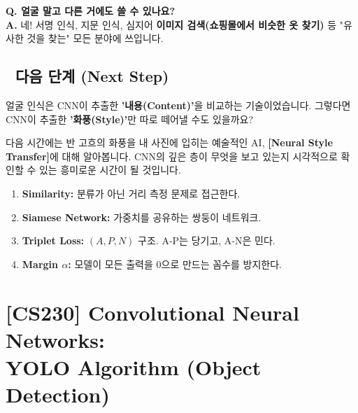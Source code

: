 \documentclass[11pt,a4paper]{book}
\theoremstyle{definition}
\begin{document}
\textbf{Q. 얼굴 말고 다른 거에도 쓸 수 있나요?} \\
\textbf{A.} 네! 서명 인식, 지문 인식, 심지어 \textbf{이미지 검색(쇼핑몰에서 비슷한 옷 찾기)} 등 "유사한 것을 찾는" 모든 분야에 쓰입니다.

\section*{🔗 다음 단계 (Next Step)}
얼굴 인식은 CNN이 추출한 \textbf{'내용(Content)'}을 비교하는 기술이었습니다.
그렇다면 CNN이 추출한 \textbf{'화풍(Style)'}만 따로 떼어낼 수도 있을까요?

다음 시간에는 반 고흐의 화풍을 내 사진에 입히는 예술적인 AI, \textbf{[Neural Style Transfer]}에 대해 알아봅니다. CNN의 깊은 층이 무엇을 보고 있는지 시각적으로 확인할 수 있는 흥미로운 시간이 될 것입니다.

\vspace{0.5cm}

\begin{summarybox}[title={단원 요약 (Cheat Sheet)}]
\begin{enumerate}
    \item \textbf{Similarity:} 분류가 아닌 거리 측정 문제로 접근한다.
    \item \textbf{Siamese Network:} 가중치를 공유하는 쌍둥이 네트워크.
    \item \textbf{Triplet Loss:} $(A, P, N)$ 구조. A-P는 당기고, A-N은 민다.
    \item \textbf{Margin $\alpha$:} 모델이 모든 출력을 0으로 만드는 꼼수를 방지한다.
\end{enumerate}
\end{summarybox}


\chapter{[CS230] Convolutional Neural Networks: \\ YOLO Algorithm (Object Detection)}
\label{ch:lecture37}

\end{document}
